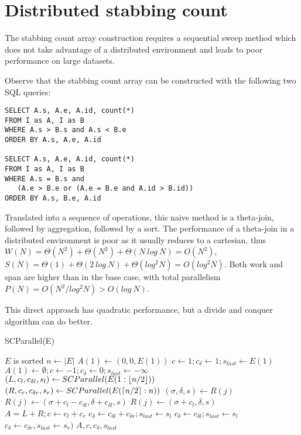\section{Distributed stabbing count}
\label{sec:distributed}

The stabbing count array construction requires a sequential sweep
method which does not take advantage of a distributed environment and
leads to poor performance on large datasets.

Observe that the stabbing count array can be constructed with the
following two SQL queries:

\begin{small}
\begin{verbatim}
SELECT A.s, A.e, A.id, count(*) 
FROM I as A, I as B 
WHERE A.s > B.s and A.s < B.e 
ORDER BY A.s, A.e, A.id

SELECT A.s, A.e, A.id, count(*)
FROM I as A, I as B
WHERE A.s = B.s and 
   (A.e > B.e or (A.e = B.e and A.id > B.id))
ORDER BY A.s, B.e, A.id
\end{verbatim}
\end{small}

Translated into a sequence of operations, this naive method is a
theta-join, followed by aggregation, followed by a sort.  The
performance of a theta-join in a distributed environment is poor as it
usually reduces to a cartesian, thus $W(N) = \Theta(N^2) + \Theta(N^2)
+ \Theta(N~log~N) = O(N^2)$, $S(N) = \Theta(1) + \Theta(2~log~N) +
\Theta(log^2 N) = O(log^2 N)$.  Both work and span are higher than in
the base case, with total parallelism $P(N) = O(N^2 / log^2 N) >
O(log~N)$.

This direct approach has quadratic performance, but a divide and
conquer algorithm can do better.

\begin{algorithm}
\caption{SCParallel(E)}
\begin{algorithmic}[1]
\Require $E$ is sorted
\State $n \gets |E|$
\State $A(1) \gets (0,0,E(1))$
\State $c \gets 1; c_{\delta} \gets 1; s_{last} \gets E(1)$
\Else {} 
\State $A(1) \gets \emptyset; c \gets -1; c_{\delta} \gets 0; s_{last} \gets -\infty$
\EndIf
\Else
\State $(L,c_l,c_{\delta l},s_l) \gets SCParallel(E(1:\lfloor n/2\rfloor))$
\State $(R,c_r,c_{\delta r},s_r) \gets SCParallel(E(\lceil n/2\rceil:n))$
\State $(\sigma, \delta, s) \gets R(j)$
\State $R(j) \gets (\sigma + c_l - c_{\delta l}, \delta + c_{\delta l}, s)$
\Else
\State $R(j) \gets (\sigma + c_l, \delta, s)$
\EndIf
\EndFor
\State $A = L + R; c \gets c_l + c_r$
\State $c_{\delta} \gets c_{\delta l} + c_{\delta r}; s_{last} \gets s_l$
\Else
{}
\State $c_{\delta} \gets c_{\delta l}; s_{last} \gets s_l$
\Else
\State $c_{\delta} \gets c_{\delta r}, s_{last} \gets s_r)$
\EndIf
\EndIf
\EndIf
\State \Return $A, c, c_{\delta}, s_{last}$
\end{algorithmic}
\label{alg:divideconquer}
\end{algorithm}

